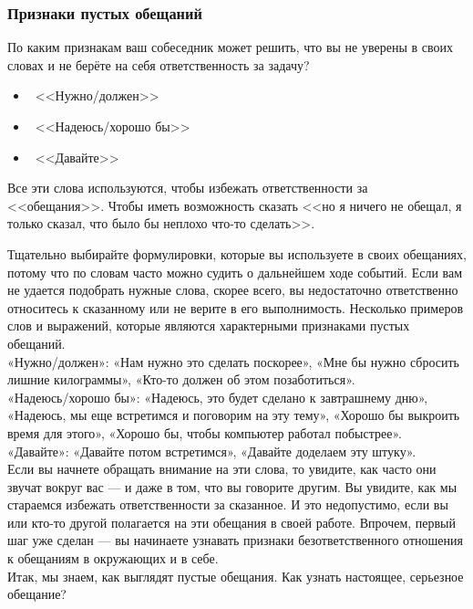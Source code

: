 \documentclass{../industrial-development}
\begin{document}
\begin{frame} \frametitle{Признаки пустых обещаний}
По каким признакам ваш собеседник может решить, что вы не уверены в своих словах и не берёте на себя ответственность за задачу?
\begin{itemize}
	\item  <<Нужно/должен>>
	\item  <<Надеюсь/хорошо бы>>
	\item  <<Давайте>>
\end{itemize}
Все эти слова используются, чтобы избежать ответственности за <<обещания>>. Чтобы иметь возможность сказать <<но я ничего не обещал, я только сказал, что было бы неплохо что-то сделать>>.
\end{frame}
\lecturenotes
Тщательно выбирайте формулировки, которые вы используете в своих обещаниях, потому что по словам часто можно судить о дальнейшем ходе событий. Если вам не удается подобрать нужные слова, скорее всего, вы недостаточно ответственно относитесь к сказанному или не верите в его выполнимость. Несколько примеров слов и выражений, которые являются характерными признаками пустых обещаний.\\
«Нужно/должен»: «Нам нужно это сделать поскорее», «Мне бы нужно сбросить лишние килограммы», «Кто-то должен об этом позаботиться».\\
«Надеюсь/хорошо бы»: «Надеюсь, это будет сделано к завтрашнему дню», «Надеюсь, мы еще встретимся и поговорим на эту тему», «Хорошо бы выкроить время для этого», «Хорошо бы, чтобы компьютер работал побыстрее».\\
«Давайте»: «Давайте потом встретимся», «Давайте доделаем эту штуку».\\
Если вы начнете обращать внимание на эти слова, то увидите, как часто они звучат вокруг вас — и даже в том, что вы говорите другим. Вы увидите, как мы стараемся избежать ответственности за сказанное. И это недопустимо, если вы или кто-то другой полагается на эти обещания в своей работе. Впрочем, первый шаг уже сделан — вы начинаете узнавать признаки безответственного отношения к обещаниям в окружающих и в себе.\\
Итак, мы знаем, как выглядят пустые обещания. Как узнать настоящее, серьезное обещание?
\end{document}
